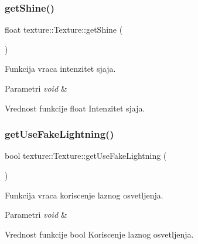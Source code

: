 \subsubsection{\texorpdfstring{get\+Shine()}{getShine()}}
{\footnotesize\ttfamily float texture\+::\+Texture\+::get\+Shine (\begin{DoxyParamCaption}{ }\end{DoxyParamCaption})}



Funkcija vraca intenzitet sjaja. 


\begin{DoxyParams}{Parametri}
{\em void} & \\
\hline
\end{DoxyParams}
\begin{DoxyReturn}{Vrednost funkcije}
float Intenzitet sjaja. 
\end{DoxyReturn}
\mbox{\label{classtexture_1_1Texture_adba4e7c4fa1d9cf6691af081c63bf962}} 
\subsubsection{\texorpdfstring{get\+Use\+Fake\+Lightning()}{getUseFakeLightning()}}
{\footnotesize\ttfamily bool texture\+::\+Texture\+::get\+Use\+Fake\+Lightning (\begin{DoxyParamCaption}{ }\end{DoxyParamCaption})}



Funkcija vraca koriscenje laznog osvetljenja. 


\begin{DoxyParams}{Parametri}
{\em void} & \\
\hline
\end{DoxyParams}
\begin{DoxyReturn}{Vrednost funkcije}
bool Koriscenje laznog osvetljenja. 
\end{DoxyReturn}
\mbox{\label{classtexture_1_1Texture_a31e8e44a5b4fe35c5f5b46232203748b}} 
